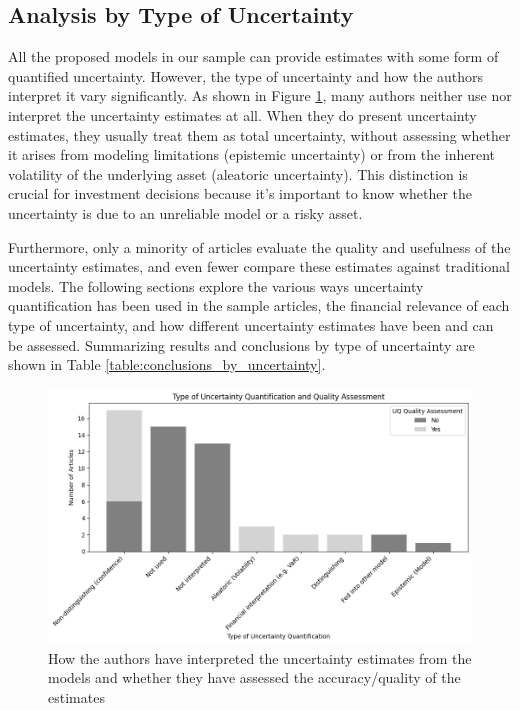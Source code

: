 


\subsection{Analysis by Type of Uncertainty}
All the proposed models in our sample can provide estimates with some form of quantified uncertainty. However, the type of uncertainty and how the authors interpret it vary significantly. As shown in Figure \ref{fig:uncertainty_quantification_by_type_and_assessment}, many authors neither use nor interpret the uncertainty estimates at all. When they do present uncertainty estimates, they usually treat them as total uncertainty, without assessing whether it arises from modeling limitations (epistemic uncertainty) or from the inherent volatility of the underlying asset (aleatoric uncertainty). This distinction is crucial for investment decisions because it's important to know whether the uncertainty is due to an unreliable model or a risky asset.

Furthermore, only a minority of articles evaluate the quality and usefulness of the uncertainty estimates, and even fewer compare these estimates against traditional models. The following sections explore the various ways uncertainty quantification has been used in the sample articles, the financial relevance of each type of uncertainty, and how different uncertainty estimates have been and can be assessed. Summarizing results and conclusions by type of uncertainty are shown in Table \ref{table:conclusions_by_uncertainty}.


\begin{figure}[H]
    \centering
    \includegraphics[width=1\linewidth]{Images/uncertainty_quantification_by_type_and_assessment.png}
    \caption{How the authors have interpreted the uncertainty estimates from the models and whether they have assessed the accuracy/quality of the estimates}
    \label{fig:uncertainty_quantification_by_type_and_assessment}
\end{figure}


